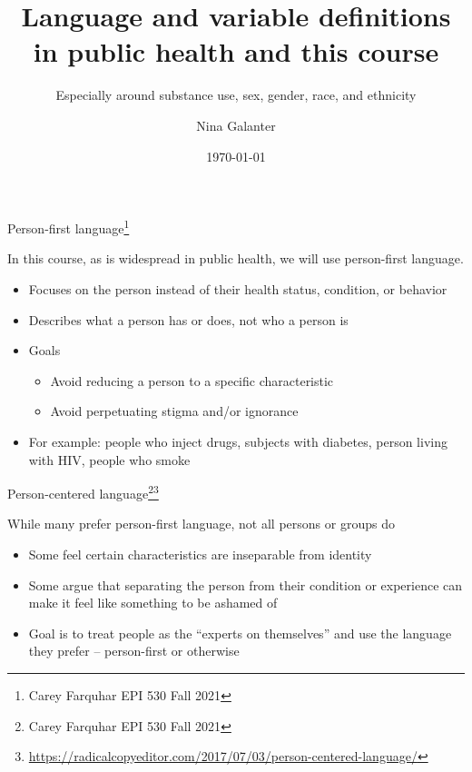 \documentclass[10pt,t]{beamer}
\title{Language and variable definitions in public health and this course}
\subtitle{Especially around substance use, sex, gender, race, and ethnicity}
\author{Nina Galanter}
\date{\today}
\begin{document}
	\begin{frame}
	\titlepage 
\end{frame}

\begin{frame}{Person-first language\footnote{Carey Farquhar EPI 530 Fall 2021}}
	\vspace{-5 mm}
	
In this course, as is widespread in public health, we will use person-first language.
\medskip
\begin{itemize}
\item Focuses on the person instead of their health
status, condition, or behavior
\medskip
\item Describes what a person has or does, not who a
person is
\medskip
\item Goals
\medskip
\begin{itemize}
\item Avoid reducing a person to a specific characteristic
\medskip
\item Avoid perpetuating stigma and/or ignorance
\end{itemize}
\medskip
\item For example: people who inject drugs, subjects with diabetes, person living with HIV, people who smoke
\end{itemize}
\end{frame}

\begin{frame}{Person-centered language\footnote{Carey Farquhar EPI 530 Fall 2021}\footnote{\url{https://radicalcopyeditor.com/2017/07/03/person-centered-language/}}}
	\vspace{-5 mm}
	
	While many prefer person-first language, not all
	persons or groups do
	\medskip
	\begin{itemize}
	\item Some feel certain characteristics are inseparable from identity
	\medskip
	\item Some argue that separating the person from
	their condition or experience can make it feel
	like something to be ashamed of
	\medskip
	\item Goal is to treat people as the
	“experts on themselves” and use the language
	they prefer – person-first or otherwise
	\end{itemize}
\end{frame}
\end{document}
